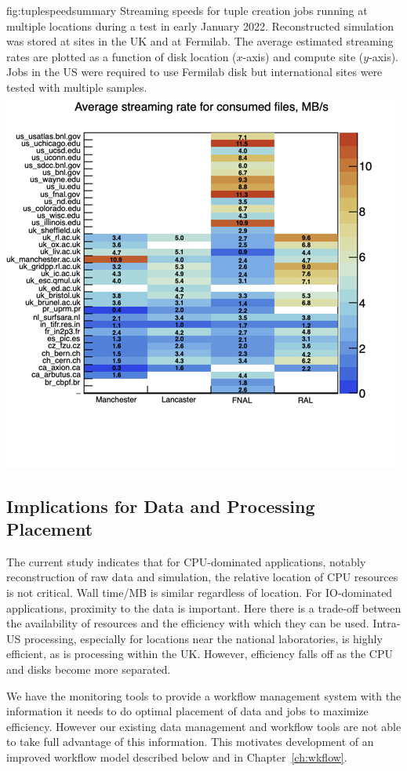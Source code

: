 \documentclass[../main-v1.tex]{subfiles}
\begin{document}
\begin{dunefigure}
{fig:tuplespeedsummary} 
{Streaming speeds for tuple creation jobs running at multiple locations during a test in early January 2022. Reconstructed simulation was stored at sites in the UK and at Fermilab.  The average estimated streaming rates are plotted as a function of disk location ($x$-axis) and compute site ($y$-axis). Jobs in the US were required to use Fermilab disk but international sites were tested with multiple samples.}
\includegraphics[width=0.8 \textwidth]{graphics/Workflow/fastRates.png}
\end{dunefigure}

\subsection{Implications for Data and Processing Placement}

The current study indicates that for CPU-dominated applications, notably reconstruction of raw data and simulation, the relative location of CPU resources is not critical. Wall time/MB   is similar regardless of location. For IO-dominated applications, proximity to the data is important.  Here there is a trade-off between the availability of resources and the efficiency with which they can be used. Intra-US processing, especially for locations near the national laboratories, is highly efficient, as is processing within the UK.  However, efficiency falls off as the CPU and disks become more separated.  

We have the monitoring tools to provide a workflow management system with the information it needs to do optimal placement of data and jobs to maximize efficiency. However our existing data management and workflow tools are not able to take full advantage of this information.  This motivates development of an improved workflow model described below and in Chapter~\ref{ch:wkflow}.
\end{document}
